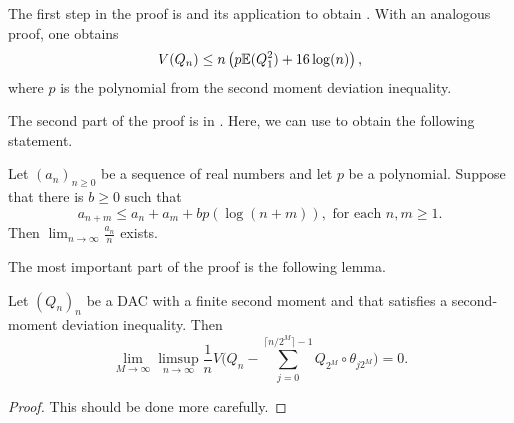 	The first step in the proof is \cite[Theorem 4.4]{MathieuSisto2020} and its application to obtain \cite[Theorem 4.2]{MathieuSisto2020}. With an analogous proof, one obtains 
	\[
	V(Q_n)\le n\left(p\mathbb{E}(Q_1^2)+16\log(n)\right),
	\]
	where $p$ is the polynomial from the second moment deviation inequality.
	
	The second part of the proof is in \cite[Lemma 4.5]{MathieuSisto2020}. Here, we can use \cite[Theorem 2]{Hammerslet1962} to obtain the following statement.
	\begin{lem}\label{lem: hammersley}
		Let $(a_n)_{n\ge 0}$ be a sequence of real numbers and let $p$ be a polynomial. Suppose that there is $b\ge 0$ such that
		\[
		a_{n+m}\le a_n+a_m+bp(\log(n+m)),\text{ for each }n,m\ge 1.
		\]
		Then $\lim_{n\to \infty}\frac{a_n}{n}$ exists.
	\end{lem}
	 The most important part of the proof is the following lemma. 
	 \begin{lem}
	 	Let $(Q_n)_n$ be a DAC with a finite second moment and that satisfies a second-moment deviation inequality. Then
	 	\[
	 	\lim_{M\to \infty}\limsup_{n\to \infty}\frac{1}{n}V\Big(Q_n-\sum_{j=0}^{\lceil n/2^M \rceil-1}Q_{2^M}\circ \theta_{j2^M}\Big)=0.
	 	\]
	 \end{lem}
	 \begin{proof}
	 	This should be done more carefully.
	 \end{proof}






